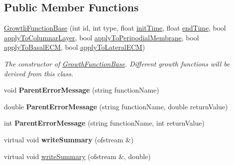 \subsection*{Public Member Functions}
\begin{DoxyCompactItemize}
\item 
\hyperlink{classGrowthFunctionBase_a5c275b3f839cc4f572b68afc5ad1064f}{Growth\+Function\+Base} (int id, int type, float \hyperlink{classGrowthFunctionBase_ae92513a7b41637df8e26e7db35ddf97c}{init\+Time}, float \hyperlink{classGrowthFunctionBase_a3ff4db0573d354a75666a5f3ca446941}{end\+Time}, bool \hyperlink{classGrowthFunctionBase_a3d56771e7c145589a14e11cc331e0326}{apply\+To\+Columnar\+Layer}, bool \hyperlink{classGrowthFunctionBase_a08ae19f58cb98fa8e315a77f52749732}{apply\+To\+Peripodial\+Membrane}, bool \hyperlink{classGrowthFunctionBase_a9fe46fc6dde4041b79204beb48972a09}{apply\+To\+Basal\+E\+C\+M}, bool \hyperlink{classGrowthFunctionBase_ac623b1dbe376bce5dddbe1a2e21c776f}{apply\+To\+Lateral\+E\+C\+M})
\begin{DoxyCompactList}\small\item\em The constructor of \hyperlink{classGrowthFunctionBase}{Growth\+Function\+Base}. Different growth functions will be derived from this class. \end{DoxyCompactList}\item 
\hypertarget{classGrowthFunctionBase_ad5b4e88d33c4b72444c5c25c25ab68fb}{}void {\bfseries Parent\+Error\+Message} (string function\+Name)\label{classGrowthFunctionBase_ad5b4e88d33c4b72444c5c25c25ab68fb}

\item 
\hypertarget{classGrowthFunctionBase_aed234af9feb797628d4a2d598dcf9632}{}double {\bfseries Parent\+Error\+Message} (string function\+Name, double return\+Value)\label{classGrowthFunctionBase_aed234af9feb797628d4a2d598dcf9632}

\item 
\hypertarget{classGrowthFunctionBase_a9097ca54f854aa0d1c8d220c971580dd}{}int {\bfseries Parent\+Error\+Message} (string function\+Name, int return\+Value)\label{classGrowthFunctionBase_a9097ca54f854aa0d1c8d220c971580dd}

\item 
\hypertarget{classGrowthFunctionBase_a2b96fbe78194d7dec43212057bbee66d}{}virtual void {\bfseries write\+Summary} (ofstream \&)\label{classGrowthFunctionBase_a2b96fbe78194d7dec43212057bbee66d}

\item 
\hypertarget{classGrowthFunctionBase_a73b474a60caeb5b6b326ecb6a056cfe4}{}virtual void \hyperlink{classGrowthFunctionBase_a73b474a60caeb5b6b326ecb6a056cfe4}{write\+Summary} (ofstream \&, double)\label{classGrowthFunctionBase_a73b474a60caeb5b6b326ecb6a056cfe4}


\end{DoxyCompactItemize}
